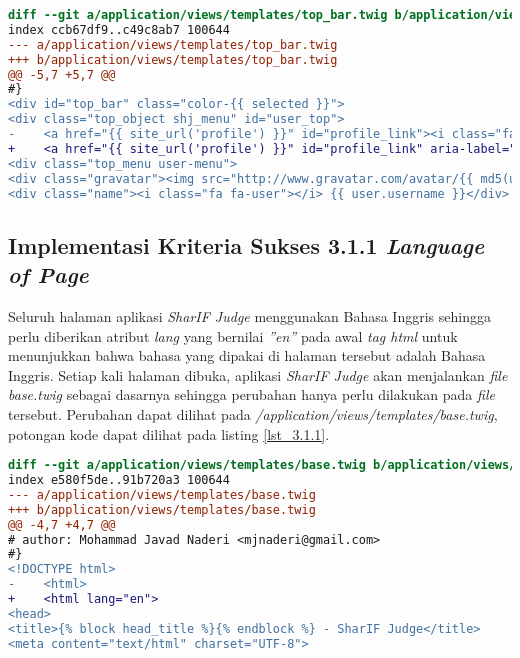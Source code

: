\begin{itemize}
\begin{lstlisting}[language=diff, caption=Perubahan untuk mematuhi kriteria 2.4.4, label=lst_2.4.4, basicstyle=\ttfamily, frame=single,
columns=fullflexible, keepspaces=true, breaklines=true]
diff --git a/application/views/templates/top_bar.twig b/application/views/templates/top_bar.twig
index ccb67df9..c49c8ab7 100644
--- a/application/views/templates/top_bar.twig
+++ b/application/views/templates/top_bar.twig
@@ -5,7 +5,7 @@
#}
<div id="top_bar" class="color-{{ selected }}">
<div class="top_object shj_menu" id="user_top">
-    <a href="{{ site_url('profile') }}" id="profile_link"><i class="fa fa-user"></i></a>
+    <a href="{{ site_url('profile') }}" id="profile_link" aria-label="Profile"><i class="fa fa-user"></i></a>
<div class="top_menu user-menu">
<div class="gravatar"><img src="http://www.gravatar.com/avatar/{{ md5(user.email) }}?s=70&d=identicon" /></div>
<div class="name"><i class="fa fa-user"></i> {{ user.username }}</div>
\end{lstlisting}

\end{itemize}

\subsection{Implementasi Kriteria Sukses 3.1.1 \textit{Language of Page}}
\label{subsec:implementasi_A_3.1.1}

Seluruh halaman aplikasi \textit{SharIF Judge} menggunakan Bahasa Inggris sehingga perlu diberikan atribut \textit{lang} yang bernilai \textit{''en''} pada awal \textit{tag html} untuk menunjukkan bahwa bahasa yang dipakai di halaman tersebut adalah Bahasa Inggris. Setiap kali halaman dibuka, aplikasi \textit{SharIF Judge} akan menjalankan \textit{file} \textit{base.twig} sebagai dasarnya sehingga perubahan hanya perlu dilakukan pada \textit{file} tersebut. Perubahan dapat dilihat pada \textit{/application/views/templates/base.twig}, potongan kode dapat dilihat pada listing \ref{lst_3.1.1}.

\begin{lstlisting}[language=diff, caption=Perubahan untuk mematuhi kriteria 3.1.1, label=lst_3.1.1, basicstyle=\ttfamily, frame=single,
columns=fullflexible, keepspaces=true, breaklines=true]
diff --git a/application/views/templates/base.twig b/application/views/templates/base.twig
index e580f5de..91b720a3 100644
--- a/application/views/templates/base.twig
+++ b/application/views/templates/base.twig
@@ -4,7 +4,7 @@
# author: Mohammad Javad Naderi <mjnaderi@gmail.com>
#}
<!DOCTYPE html>
-    <html>
+    <html lang="en">
<head>
<title>{% block head_title %}{% endblock %} - SharIF Judge</title>
<meta content="text/html" charset="UTF-8">
\end{lstlisting}


